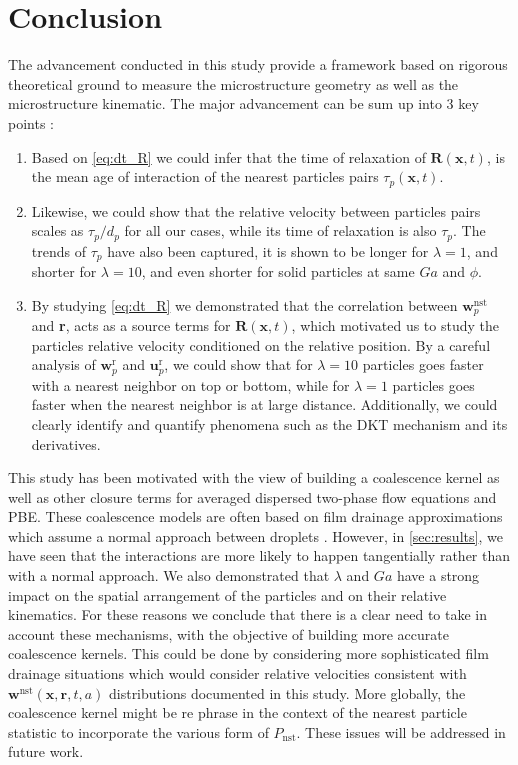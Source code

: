 \section{Conclusion}

The advancement conducted in this study provide a framework based on rigorous theoretical ground to measure the microstructure geometry as well as the microstructure kinematic.
The major advancement can be sum up into 3 key points :
\begin{enumerate}
    \item Based on \ref{eq:dt_R} we could infer that the time of relaxation of $\textbf{R}(\textbf{x},t)$, is the mean age of interaction of the  nearest particles pairs $\tau_p(\textbf{x},t)$. 
    \item Likewise, we could show that the relative velocity between particles pairs scales as $\tau_p /d_p$ for all our cases, while its time of relaxation is also $\tau_p$. 
    The trends of $\tau_p$ have also been captured, it is shown to be longer for $\lambda = 1$, and shorter for $\lambda = 10$, and even shorter for solid particles at same $Ga$ and $\phi$. 
    \item By studying \ref{eq:dt_R} we demonstrated that the correlation between $\textbf{w}_p^\text{nst}$ and \textbf{r}, acts as a source terms for $\textbf{R}(\textbf{x},t)$, which motivated us to study the particles relative velocity conditioned on the relative position. 
    By a careful analysis of $\textbf{w}_p^\text{r}$ and $\textbf{u}_p^\text{r}$, we could show that for $\lambda = 10$ particles goes faster with a nearest neighbor on top or bottom, while for $\lambda = 1$ particles goes faster when the nearest neighbor is at large distance.
    Additionally, we could clearly identify and quantify phenomena such as the DKT mechanism and its derivatives. 
\end{enumerate}

This study has been motivated with the view of building a coalescence kernel as well as other closure terms for averaged dispersed two-phase flow equations and PBE. 
These coalescence models are often based on film drainage approximations which assume a normal approach between droplets \citet{chesters1991modelling}.  
However, in \ref{sec:results}, we have seen that the interactions are more likely to happen tangentially rather than with a normal approach. 
We also demonstrated that $\lambda$ and $Ga$ have a strong impact on the spatial arrangement of the particles and on their relative kinematics. 
For these reasons we conclude that there is a clear need to take in account these mechanisms, with the objective of building more accurate coalescence kernels. 
This could be done by considering more sophisticated film drainage situations which would consider relative velocities consistent with $\textbf{w}^\text{nst}(\textbf{x},\textbf{r},t,a)$ distributions documented in this study.
More globally, the coalescence kernel might be re phrase in the context of the nearest particle statistic to incorporate the various form of $P_\text{nst}$. 
These issues will be addressed in future work.  


